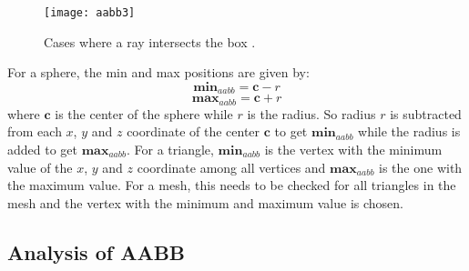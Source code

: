 \documentclass[11pt,a4paper]{article}
\begin{document}
	\begin{figure}[H]
		\centering
		\captionsetup{justification=centering}
		\texttt{[image: aabb3]}\quad
		\caption{Cases where a ray intersects the box \protect\cite{suffern2016ray}.}
	\end{figure}
	\noindent
	For a sphere, the min and max positions are given by:
	\begin{equation}
		\boldsymbol{min}_{aabb} = \boldsymbol{c} - r
	\end{equation}
	\begin{equation}
		\boldsymbol{max}_{aabb} = \boldsymbol{c} + r
	\end{equation}
	where $\boldsymbol{c}$ is the center of the sphere while $r$ is the radius. So radius $r$ is subtracted from each $x$, $y$ and $z$ coordinate of the center $\boldsymbol{c}$ to get $\boldsymbol{min}_{aabb}$ while the radius is added to get $\boldsymbol{max}_{aabb}$. For a triangle, $\boldsymbol{min}_{aabb}$ is the vertex with the minimum value of the $x$, $y$ and $z$ coordinate among all vertices and $\boldsymbol{max}_{aabb}$ is the one with the maximum value. For a mesh, this needs to be checked for all triangles in the mesh and the vertex with the minimum and maximum value is chosen.
	
	\subsection{Analysis of AABB}
	
\end{document}
